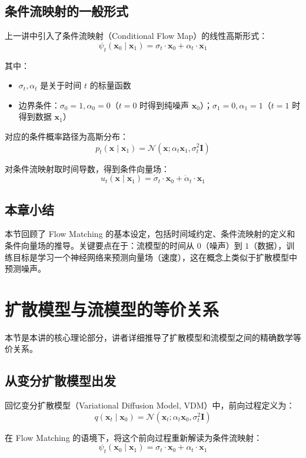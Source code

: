 \documentclass[a4paper]{article}
\begin{document}
\subsection{条件流映射的一般形式}

上一讲中引入了条件流映射（Conditional Flow Map）的线性高斯形式：
$$\psi_t(\mathbf{x}_0 \mid \mathbf{x}_1) = \sigma_t \cdot \mathbf{x}_0 + \alpha_t \cdot \mathbf{x}_1$$

其中：
\begin{itemize}
    \item $\sigma_t, \alpha_t$ 是关于时间 $t$ 的标量函数
    \item 边界条件：$\sigma_0 = 1, \alpha_0 = 0$（$t=0$ 时得到纯噪声 $\mathbf{x}_0$）；$\sigma_1 = 0, \alpha_1 = 1$（$t=1$ 时得到数据 $\mathbf{x}_1$）
\end{itemize}

对应的条件概率路径为高斯分布：
$$p_t(\mathbf{x} \mid \mathbf{x}_1) = \mathcal{N}(\mathbf{x}; \alpha_t \mathbf{x}_1, \sigma_t^2 \mathbf{I})$$

对条件流映射取时间导数，得到条件向量场：
$$u_t(\mathbf{x} \mid \mathbf{x}_1) = \dot{\sigma}_t \cdot \mathbf{x}_0 + \dot{\alpha}_t \cdot \mathbf{x}_1$$

\subsection{本章小结}

本节回顾了 Flow Matching 的基本设定，包括时间域约定、条件流映射的定义和条件向量场的推导。关键要点在于：流模型的时间从 $0$（噪声）到 $1$（数据），训练目标是学习一个神经网络来预测向量场（速度），这在概念上类似于扩散模型中预测噪声。

\section{扩散模型与流模型的等价关系}

本节是本讲的核心理论部分，讲者详细推导了扩散模型和流模型之间的精确数学等价关系。

\subsection{从变分扩散模型出发}

回忆变分扩散模型（Variational Diffusion Model, VDM）中，前向过程定义为：
$$q(\mathbf{x}_t \mid \mathbf{x}_0) = \mathcal{N}(\mathbf{x}_t; \alpha_t \mathbf{x}_0, \sigma_t^2 \mathbf{I})$$

在 Flow Matching 的语境下，将这个前向过程重新解读为条件流映射：
$$\psi_t(\mathbf{x}_0 \mid \mathbf{x}_1) = \sigma_t \cdot \mathbf{x}_0 + \alpha_t \cdot \mathbf{x}_1$$
\end{document}
